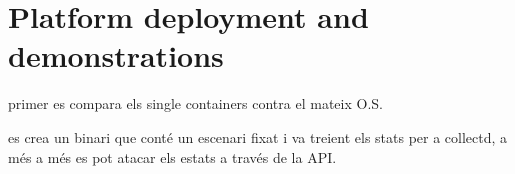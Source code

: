 \chapter{Platform deployment and demonstrations}\label{H:platformDeploymentAndDemonstrations}

primer es compara els single containers contra el mateix O.S.

es crea un binari que conté un escenari fixat i va treient els stats per a collectd, a  més a més es pot atacar els estats a través de la API.